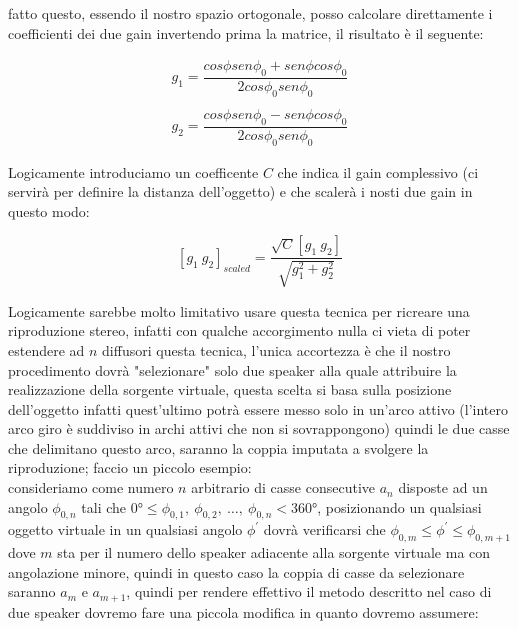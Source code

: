 \documentclass[12pt,a4paper]{report}
\begin{document}
fatto questo, essendo il nostro spazio ortogonale, posso calcolare direttamente i coefficienti dei due gain invertendo prima la matrice, il risultato è il seguente:

\begin{equation}\begin{split}
g_1=\dfrac{cos\phi sen\phi_0 + sen \phi cos\phi_0}{2 cos\phi_0 sen\phi_0}\\ \\
g_2=\dfrac{cos\phi sen\phi_0 - sen \phi cos\phi_0}{2 cos\phi_0 sen\phi_0}
\end{split}
\label{eq:eeee}
\end{equation}

Logicamente introduciamo un coefficente $C$ che indica il gain complessivo (ci servirà per definire la distanza dell'oggetto) e che scalerà i nosti due gain in questo modo:

\begin{equation}
\left[g_1 \ g_2\right]_{scaled} = \dfrac{\sqrt{C} \left[ g_1 \ g_2 \right]}{\sqrt{g_1^2 + g_2^2}} 
\label{eq:ffff}
\end{equation}

Logicamente sarebbe molto limitativo usare questa tecnica per ricreare una riproduzione stereo, infatti con qualche accorgimento nulla ci vieta di poter estendere ad $n$ diffusori questa tecnica, l'unica accortezza è che il nostro procedimento dovrà "selezionare" solo due speaker alla quale attribuire la realizzazione della sorgente virtuale, questa scelta si basa sulla posizione dell'oggetto infatti quest'ultimo potrà essere messo solo in un'arco attivo (l'intero arco giro è suddiviso in archi attivi che non si sovrappongono) quindi le due casse che delimitano questo arco, saranno la coppia imputata a svolgere la riproduzione; faccio un piccolo esempio:\\

consideriamo come numero $n$ arbitrario di casse consecutive $a_n$ disposte ad un angolo $\phi_{0,n}$ tali che $0°\leq \phi_{0,1},\ \phi_{0,2},\ \ldots,\ \phi_{0,n} <360°$, posizionando un qualsiasi oggetto virtuale in un qualsiasi angolo $\phi^{\prime}$ dovrà verificarsi che $\phi_{0,m}\leq \phi^{\prime} \leq \phi_{0,m+1}$ dove $m$ sta per il numero dello speaker adiacente alla sorgente virtuale ma con angolazione minore, quindi in questo caso la coppia di casse da selezionare saranno $a_m$ e $a_{m+1}$, quindi per rendere effettivo il metodo descritto nel caso di due speaker dovremo fare una piccola modifica in quanto dovremo assumere: 
\end{document}
